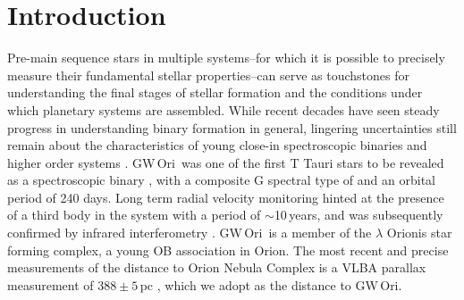 \documentclass[twocolumn]{aastex61}
\newcommand{\todo}[1]{ \textcolor{red}{#1}}
\newcommand{\gw}{GW\,Ori}
\newcommand{\obj}{\gw}
\newcommand{\thirteen}{${}^{13}$CO}
\newcommand{\eighteen}{C${}^{18}$O}
\begin{document}
\begin{abstract}
We present spatially and spectrally resolved Atacama Large Millimeter/submillimeter Array (ALMA) observations of gas and dust in the disk orbiting the pre-main sequence triple GW Ori. We forward-model the \thirteen\ and \eighteen\ $J$=2--1 transitions to put precise constraint on the total stellar mass of $5.29 \pm 0.06\,M_\odot$, and disk inclination of $i_\mathrm{disk} = 137.6 \pm 0.3^\circ$. We use 35 years of optical radial velocity monitoring and spectroscopic dentangling techniques to reveal \obj\ as a near equal-flux double-lined spectroscopic binary. Combining the measurements from these two datasets yields a precise constraint on the stellar masses of \todo{XX}. We publish a light curve with a 30-year baseline that shows several eclipse events. We show that this precise mass is consistent with the predictions of leading pre-main sequence evolutionary models based upon its observed photospheric properties. We put constraints on the orbital configuration of the triple system within the massive disk and discuss this in the context of star and planet formation.
\end{abstract}

\section{Introduction} \label{sec:intro}

Pre-main sequence stars in multiple systems--for which it is possible to precisely measure their fundamental stellar properties--can serve as touchstones for understanding the final stages of stellar formation and the conditions under which planetary systems are assembled. While recent decades have seen steady progress in understanding binary formation in general, lingering uncertainties still remain about the characteristics of young close-in spectroscopic binaries and higher order systems \citep{duchene13}.
\gw\ was one of the first T Tauri stars to be revealed as a spectroscopic binary \citep{mathieu91}, with a composite G spectral type of and an orbital period of 240 days. Long term radial velocity monitoring hinted at the presence of a third body in the system with a period of $\sim$10\,years, and was subsequently confirmed by infrared interferometry \citep{berger11}. \gw\ is a member of the $\lambda$ Orionis star forming complex, a young OB association \citep{dolan00,dolan01,dolan02} in Orion. The most recent and precise measurements of the distance to Orion Nebula Complex is a VLBA parallax measurement of $388\pm5\,$pc \citep{kounkel17}, which we adopt as the distance to \gw.
\end{document}
